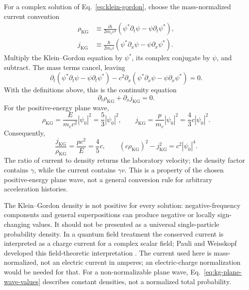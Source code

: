 \documentclass[12pt]{article}
\begin{document}
For a complex solution of Eq.~\eqref{eq:klein-gordon}, choose the mass-normalized current convention
\begin{align}
  \rho_{\mathrm{KG}}
  &\equiv\frac{i\hbar}{2m_ec^2}
    \left(\psi^*\partial_t\psi-\psi\partial_t\psi^*\right),
  \label{eq:kg-density}\\
  j_{\mathrm{KG}}
  &\equiv\frac{\hbar}{2m_e i}
    \left(\psi^*\partial_x\psi-\psi\partial_x\psi^*\right).
  \label{eq:kg-current}
\end{align}
Multiply the Klein--Gordon equation by $\psi^*$, its complex conjugate by $\psi$, and subtract. The mass terms cancel, leaving
\begin{equation}
  \partial_t\left(\psi^*\partial_t\psi-\psi\partial_t\psi^*\right)
  -c^2\partial_x\left(\psi^*\partial_x\psi-\psi\partial_x\psi^*\right)=0.
  \label{eq:kg-subtraction}
\end{equation}
With the definitions above, this is the continuity equation
\begin{equation}
  \partial_t\rho_{\mathrm{KG}}+\partial_xj_{\mathrm{KG}}=0.
  \label{eq:kg-continuity}
\end{equation}
For the positive-energy plane wave,
\begin{equation}
  \rho_{\mathrm{KG}}
  =\frac{E}{m_ec^2}|\psi_0|^2
  =\frac{5}{3}|\psi_0|^2,
  \qquad
  j_{\mathrm{KG}}
  =\frac{p}{m_e}|\psi_0|^2
  =\frac{4}{3}c|\psi_0|^2.
  \label{eq:kg-plane-wave-values}
\end{equation}
Consequently,
\begin{equation}
  \frac{j_{\mathrm{KG}}}{\rho_{\mathrm{KG}}}
  =\frac{pc^2}{E}=\frac{4}{5}c,
  \qquad
  (c\rho_{\mathrm{KG}})^2-j_{\mathrm{KG}}^2
  =c^2|\psi_0|^4.
  \label{eq:kg-current-ratio}
\end{equation}
The ratio of current to density returns the laboratory velocity; the density factor contains $\gamma$, while the current contains $\gamma v$. This is a property of the chosen positive-energy plane wave, not a general conversion rule for arbitrary acceleration histories.

The Klein--Gordon density is not positive for every solution: negative-frequency components and general superpositions can produce negative or locally sign-changing values. It should not be presented as a universal single-particle probability density. In a quantum field treatment the conserved current is interpreted as a charge current for a complex scalar field; Pauli and Weisskopf developed this field-theoretic interpretation \cite{PauliWeisskopf1934}. The current used here is mass-normalized, not an electric current in amperes; an electric-charge normalization would be needed for that. For a non-normalizable plane wave, Eq.~\eqref{eq:kg-plane-wave-values} describes constant densities, not a normalized total probability.
\end{document}
